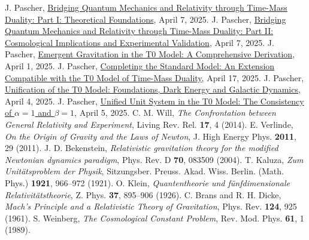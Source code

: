\documentclass[12pt,a4paper]{article}
\begin{document}
	\begin{thebibliography}{99}
		 J. Pascher, \href{https://github.com/jpascher/T0-Time-Mass-Duality/tree/main/2/pdf/English/QMRelTimeMassPart1En.pdf}{Bridging Quantum Mechanics and Relativity through Time-Mass Duality: Part I: Theoretical Foundations}, April 7, 2025.
		 J. Pascher, \href{https://github.com/jpascher/T0-Time-Mass-Duality/tree/main/2/pdf/English/QMRelTimeMassPart2En.pdf}{Bridging Quantum Mechanics and Relativity through Time-Mass Duality: Part II: Cosmological Implications and Experimental Validation}, April 7, 2025.
		 J. Pascher, \href{https://github.com/jpascher/T0-Time-Mass-Duality/tree/main/2/pdf/English/EmergentGravT0En.pdf}{Emergent Gravitation in the T0 Model: A Comprehensive Derivation}, April 1, 2025.
		 J. Pascher, \href{https://github.com/jpascher/T0-Time-Mass-Duality/tree/main/2/pdf/English/StandardModKruemmungRotvEn.pdf}{Completing the Standard Model: An Extension Compatible with the T0 Model of Time-Mass Duality}, April 17, 2025.
		 J. Pascher, \href{https://github.com/jpascher/T0-Time-Mass-Duality/tree/main/2/pdf/English/T0VereinheitlichungDEGalEn.pdf}{Unification of the T0 Model: Foundations, Dark Energy and Galactic Dynamics}, April 4, 2025.
		 J. Pascher, \href{https://github.com/jpascher/T0-Time-Mass-Duality/tree/main/2/pdf/English/Alpha1Beta1KonsistenzEn.pdf}{Unified Unit System in the T0 Model: The Consistency of \(\alpha = 1\) and \(\beta = 1\)}, April 5, 2025.
		 C. M. Will, \textit{The Confrontation between General Relativity and Experiment}, Living Rev. Rel. \textbf{17}, 4 (2014).
		 E. Verlinde, \textit{On the Origin of Gravity and the Laws of Newton}, J. High Energy Phys. \textbf{2011}, 29 (2011).
		 J. D. Bekenstein, \textit{Relativistic gravitation theory for the modified Newtonian dynamics paradigm}, Phys. Rev. D \textbf{70}, 083509 (2004).
		 T. Kaluza, \textit{Zum Unitätsproblem der Physik}, Sitzungsber. Preuss. Akad. Wiss. Berlin. (Math. Phys.) \textbf{1921}, 966–972 (1921).
		 O. Klein, \textit{Quantentheorie und fünfdimensionale Relativitätstheorie}, Z. Phys. \textbf{37}, 895–906 (1926).
		 C. Brans and R. H. Dicke, \textit{Mach's Principle and a Relativistic Theory of Gravitation}, Phys. Rev. \textbf{124}, 925 (1961).
		 S. Weinberg, \textit{The Cosmological Constant Problem}, Rev. Mod. Phys. \textbf{61}, 1 (1989).

\end{thebibliography}
\end{document}
